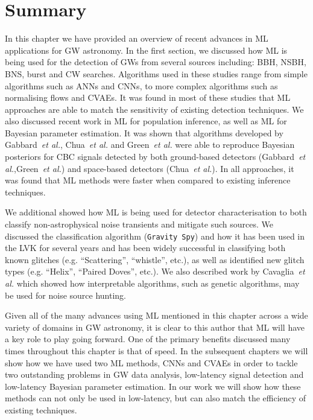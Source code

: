 \section{Summary}
In this chapter we have provided an overview of recent advances in \ac{ML}
applications for \ac{GW} astronomy. In the first section, 
we discussed how \ac{ML} is being used for the 
detection of \ac{GW}s from several 
sources including: \ac{BBH}, \ac{NSBH}, \ac{BNS}, burst and \ac{CW} 
searches. Algorithms used in these studies range from simple algorithms such 
as \ac{ANN}s and \acp{CNN}, to more complex algorithms such as 
normalising flows and \acp{CVAE}. It was found in most of these studies 
that \ac{ML} approaches are able to match the sensitivity of existing 
detection techniques. We also discussed recent work in \ac{ML} for 
population inference, as well as \ac{ML} for Bayesian parameter estimation. 
It was shown that algorithms developed by Gabbard~\textit{et al.}, 
Chua~\textit{et al.} and Green~\textit{et al.} were able to 
reproduce Bayesian posteriors for \ac{CBC} signals detected by both ground-based 
detectors (Gabbard~\textit{et al.},Green~\textit{et al.}) and 
space-based detectors (Chua~\textit{et al.}). In all approaches, it was 
found that \ac{ML} methods were faster when compared to 
existing inference techniques.

We additional showed how \ac{ML} is being used for 
detector characterisation to both classify non-astrophysical noise 
transients and mitigate such sources. We discussed the classification 
algorithm (\texttt{Gravity Spy}) and how it has been used in 
the \ac{LVK} for several years and has been widely successful in 
classifying both known glitches (e.g. ``Scattering'', ``whistle'', etc.), as 
well as identified new glitch types (e.g. ``Helix'', ``Paired Doves'', etc.). We 
also described work by Cavaglia~\textit{et al.} which 
showed how interpretable algorithms, such as genetic algorithms, 
may be used for noise source hunting.

%
Given all of the many advances using \ac{ML} mentioned in this chapter 
across a wide variety of domains in \ac{GW} astronomy, 
it is clear to this author that \ac{ML} will have a key role to play 
going forward. One of the primary benefits discussed many times throughout 
this chapter is that of speed. In the subsequent chapters we will show 
how we have used two \ac{ML} methods, \acp{CNN} and \acp{CVAE} in order 
to tackle two outstanding problems in \ac{GW} 
data analysis, low-latency signal detection and low-latency 
Bayesian parameter estimation. In 
our work we will show how these methods can not only be used in low-latency, 
but can also match the efficiency of existing techniques.
